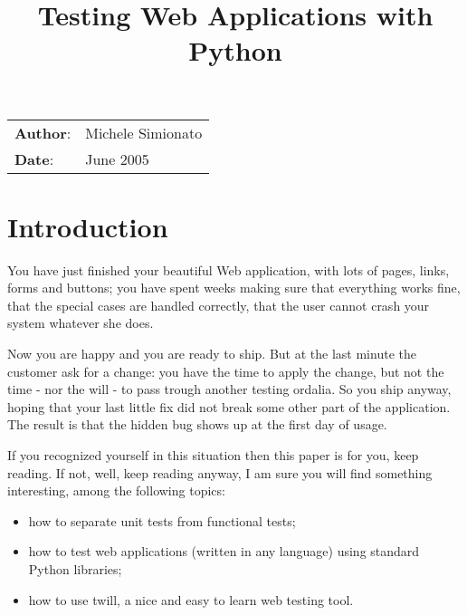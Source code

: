 \documentclass[10pt,a4paper,english]{article}
\title{Testing Web Applications with Python}
\author{}
\date{}
\newlength{\docinfowidth}
\newlength{\locallinewidth}
\begin{document}
\maketitle

\begin{center}
\begin{tabularx}{\docinfowidth}{lX}
\textbf{Author}: &
	Michele Simionato \\
\textbf{Date}: &
	June 2005 \\
\end{tabularx}
\end{center}

\setlength{\locallinewidth}{\linewidth}



\hypertarget{introduction}{}
\section*{Introduction}

You have just finished your beautiful Web application, with
lots of pages, links, forms and buttons; you have spent weeks
making sure that everything works fine, 
that the special cases are handled correctly, that the user cannot 
crash your system whatever she does.

Now you are happy and you are ready to ship. But at the last minute
the customer ask for a change: you have the time to apply the change,
but not the time - nor the will - to pass trough another testing 
ordalia. So you ship anyway, hoping that your last little fix did not break 
some other part of the application. The result is that the hidden bug 
shows up at the first day of usage.

If you recognized yourself in this situation then this paper 
is for you, keep reading. If not, well, keep reading anyway,
I am sure you will find something interesting, among the following topics:
\begin{itemize}
\item {} 
how to separate unit tests from functional tests;

\item {} 
how to test web applications (written in any language) using 
standard Python libraries;

\item {} 
how to use twill, a nice and easy to learn web testing tool.

\end{itemize}
\end{document}
